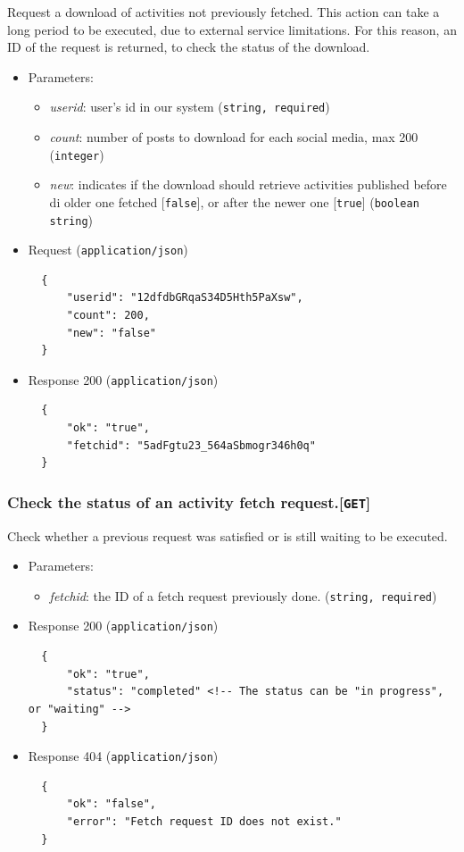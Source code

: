 Request a download of activities not previously fetched. This action can take a long period to be executed, due to external service limitations. For this reason, an ID of the request is returned, to check the status of the download.

\begin{itemize}
\item
  Parameters:

  \begin{itemize}
  \item
    \textit{userid}: user's id in our system (\texttt{string, required})
  \item
    \textit{count}: number of posts to download for each social media, max 200 (\texttt{integer})
  \item
    \textit{new}: indicates if the download should retrieve activities published before di older one fetched {[}\texttt{false}{]}, or after the newer one {[}\texttt{true}{]} (\texttt{boolean string})
  \end{itemize}
\item
  Request (\texttt{application/json})

\begin{verbatim}
  {
      "userid": "12dfdbGRqaS34D5Hth5PaXsw",
      "count": 200,
      "new": "false"
  }
\end{verbatim}
\item
  Response 200 (\texttt{application/json})

\begin{verbatim}
  {
      "ok": "true",
      "fetchid": "5adFgtu23_564aSbmogr346h0q"
  }
\end{verbatim}
\end{itemize}

\subsubsection{Check the status of an activity fetch request.{[}\protect\texttt{GET}{]}}

Check whether a previous request was satisfied or is still waiting to be executed.

\begin{itemize}
\item
  Parameters:

  \begin{itemize}
  \item
    \textit{fetchid}: the ID of a fetch request previously done. (\texttt{string, required})
  \end{itemize}
\item
  Response 200 (\texttt{application/json})

\begin{verbatim}
  {
      "ok": "true",
      "status": "completed" <!-- The status can be "in progress", or "waiting" -->
  }
\end{verbatim}
\item
  Response 404 (\texttt{application/json})

\begin{verbatim}
  {
      "ok": "false",
      "error": "Fetch request ID does not exist."
  }
\end{verbatim}
\end{itemize}

